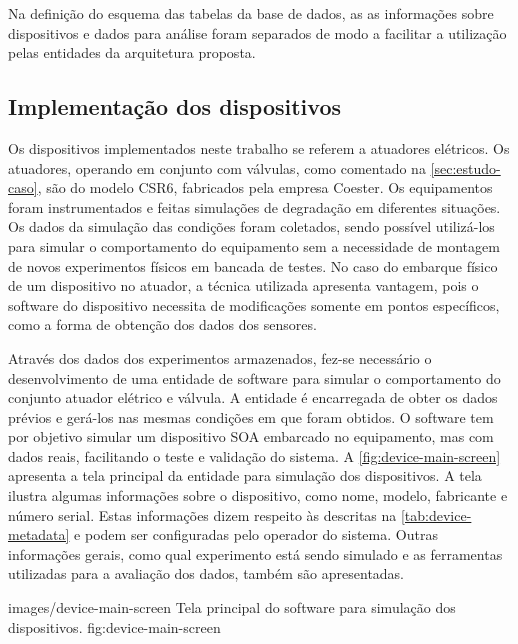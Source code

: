 Na definição do esquema das tabelas da base de dados, as as informações sobre dispositivos e dados
para análise foram separados de modo a facilitar a utilização pelas entidades da arquitetura
proposta.



\subsection{Implementação dos dispositivos}

Os dispositivos implementados neste trabalho se referem a atuadores elétricos. Os atuadores,
operando em conjunto com válvulas, como comentado na \cref{sec:estudo-caso}, são do modelo CSR6,
fabricados pela empresa Coester. Os equipamentos foram instrumentados e feitas simulações de
degradação em diferentes situações. Os dados da simulação das condições foram coletados, sendo
possível utilizá-los para simular o comportamento do equipamento sem a necessidade de montagem de
novos experimentos físicos em bancada de testes. No caso do embarque físico de um dispositivo no
atuador, a técnica utilizada apresenta vantagem, pois o software do dispositivo necessita de
modificações somente em pontos específicos, como a forma de obtenção dos dados dos sensores.

Através dos dados dos experimentos armazenados, fez-se necessário o desenvolvimento de uma entidade
de software para simular o comportamento do conjunto atuador elétrico e válvula. A entidade é
encarregada de obter os dados prévios e gerá-los nas mesmas condições em que foram obtidos. O
software tem por objetivo simular um dispositivo \gls{SOA} embarcado no equipamento, mas com dados
reais, facilitando o teste e validação do sistema. A \cref{fig:device-main-screen} apresenta a tela
principal da entidade para simulação dos dispositivos. A tela ilustra algumas informações sobre o
dispositivo, como nome, modelo, fabricante e número serial. Estas informações dizem respeito às
descritas na \cref{tab:device-metadata} e podem ser configuradas pelo operador do sistema. Outras
informações gerais, como qual experimento está sendo simulado e as ferramentas utilizadas para a
avaliação dos dados, também são apresentadas.

  {images/device-main-screen}
  {Tela principal do software para simulação dos dispositivos.}
  {fig:device-main-screen}

